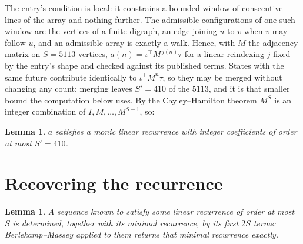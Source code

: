 \documentclass[11pt,a4paper]{article}
\theoremstyle{plain}
\newtheorem{lemma}[theorem]{Lemma}
\theoremstyle{definition}
\begin{document}
The entry's condition is local: it constrains a bounded window of consecutive lines of the
array and nothing further. The admissible configurations of one such window are the vertices
of a finite digraph, an edge joining $u$ to $v$ when $v$ may follow $u$, and an admissible
array is exactly a walk. Hence, with $M$ the adjacency matrix on $S=5113$ vertices,
$a(n)=\iota^{\!\top}M^{\,j(n)}\tau$ for a linear reindexing $j$ fixed by the entry's shape
and checked against its published terms. States with the same future contribute identically to $\iota^{\!\top}M^n\tau$, so they may be merged without changing any count; merging leaves $S'=410$ of the $5113$, and it is that smaller bound the computation below uses. By the Cayley--Hamilton theorem $M^{S}$ is an
integer combination of $I,M,\dots,M^{S-1}$, so:

\begin{lemma}\label{lem:cf}
$a$ satisfies a monic linear recurrence with integer coefficients of order at most
$S'=410$.
\end{lemma}

\section{Recovering the recurrence}

\begin{lemma}\label{lem:bm}
A sequence known to satisfy some linear recurrence of order at most $S$ is determined, together
with its minimal recurrence, by its first $2S$ terms: Berlekamp--Massey applied to them returns
that minimal recurrence exactly.
\end{lemma}
\end{document}
